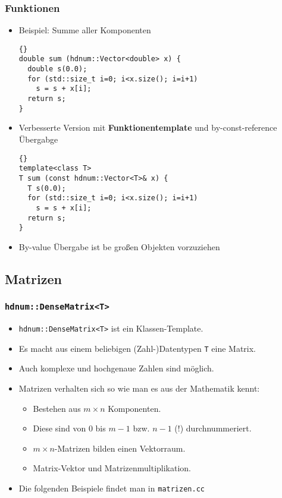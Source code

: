 \documentclass[a4paper,11pt]{article}
\theoremstyle{definition}
\begin{document}
\begin{frame}[fragile]
\frametitle{Funktionen}
\begin{itemize}
\item Beispiel: Summe aller Komponenten\\
{\footnotesize{\begin{lstlisting}{}
double sum (hdnum::Vector<double> x) {
  double s(0.0);
  for (std::size_t i=0; i<x.size(); i=i+1)
    s = s + x[i];
  return s;
}
\end{lstlisting}}}
\item Verbesserte Version mit \textbf{Funktionentemplate} und by-const-reference Übergabge\\
{\footnotesize{\begin{lstlisting}{}
template<class T>
T sum (const hdnum::Vector<T>& x) {
  T s(0.0);
  for (std::size_t i=0; i<x.size(); i=i+1)
    s = s + x[i];
  return s;
}
\end{lstlisting}}}
\item By-value Übergabe ist be großen Objekten vorzuziehen
\end{itemize}
\end{frame}

\subsection{Matrizen}

\begin{frame}[fragile]
\frametitle{\lstinline{hdnum::DenseMatrix<T>}}
\begin{itemize}
\item \lstinline{hdnum::DenseMatrix<T>} ist ein Klassen-Template.
\item Es macht aus einem beliebigen (Zahl-)Datentypen \lstinline{T}
  eine Matrix.
\item Auch komplexe und hochgenaue Zahlen sind möglich.
\item Matrizen verhalten sich so wie man es aus der Mathematik kennt:
\begin{itemize}
\item Bestehen aus $m\times n$ Komponenten.
\item Diese sind von $0$ bis $m-1$ bzw. $n-1$ (!) durchnummeriert.
\item $m\times n$-Matrizen bilden einen Vektorraum.
\item Matrix-Vektor und Matrizenmultiplikation.
\end{itemize}
\item Die folgenden Beispiele findet man in \lstinline{matrizen.cc}
\end{itemize}
\end{frame}
\end{document}
